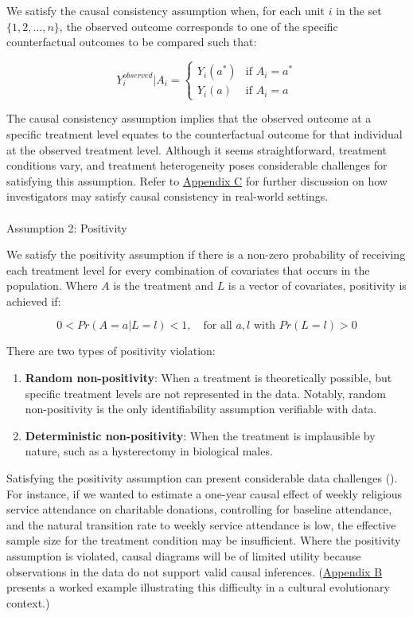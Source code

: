\documentclass[
  single column]{article}
\makeatletter
\let\oldparagraph\paragraph
\renewcommand{\paragraph}{
    \@ifstar
      \xxxParagraphStar
      \xxxParagraphNoStar
  }
\newcommand{\xxxParagraphStar}[1]{\oldparagraph*{#1}\mbox{}}
\newcommand{\xxxParagraphNoStar}[1]{\oldparagraph{#1}\mbox{}}
\providecommand{\tightlist}{%
  \setlength{\itemsep}{0pt}\setlength{\parskip}{0pt}}\usepackage{longtable,booktabs,array}
\makeatother
\begin{document}
We satisfy the causal consistency assumption when, for each unit \(i\)
in the set \(\{1, 2, \ldots, n\}\), the observed outcome corresponds to
one of the specific counterfactual outcomes to be compared such that:

\[
Y_i^{observed}|A_i = 
\begin{cases} 
Y_i(a^*) & \text{if } A_i = a^* \\
Y_i(a) & \text{if } A_i = a
\end{cases}
\]

The causal consistency assumption implies that the observed outcome at a
specific treatment level equates to the counterfactual outcome for that
individual at the observed treatment level. Although it seems
straightforward, treatment conditions vary, and treatment heterogeneity
poses considerable challenges for satisfying this assumption. Refer to
\hyperref[id-app-c]{Appendix C} for further discussion on how
investigators may satisfy causal consistency in real-world settings.

\paragraph{Assumption 2: Positivity}\label{assumption-2-positivity}

We satisfy the positivity assumption if there is a non-zero probability
of receiving each treatment level for every combination of covariates
that occurs in the population. Where \(A\) is the treatment and \(L\) is
a vector of covariates, positivity is achieved if:

\[
0 < Pr(A = a | L = l) < 1, \quad \text{for all } a, l \text{ with } Pr(L = l) > 0
\]

There are two types of positivity violation:

\begin{enumerate}
\def\labelenumi{\arabic{enumi}.}
\tightlist
\item
  \textbf{Random non-positivity}: When a treatment is theoretically
  possible, but specific treatment levels are not represented in the
  data. Notably, random non-positivity is the only identifiability
  assumption verifiable with data.
\item
  \textbf{Deterministic non-positivity}: When the treatment is
  implausible by nature, such as a hysterectomy in biological males.
\end{enumerate}

Satisfying the positivity assumption can present considerable data
challenges (). For
instance, if we wanted to estimate a one-year causal effect of weekly
religious service attendance on charitable donations, controlling for
baseline attendance, and the natural transition rate to weekly service
attendance is low, the effective sample size for the treatment condition
may be insufficient. Where the positivity assumption is violated, causal
diagrams will be of limited utility because observations in the data do
not support valid causal inferences. (\hyperref[id-app-b]{Appendix B}
presents a worked example illustrating this difficulty in a cultural
evolutionary context.)
\end{document}
